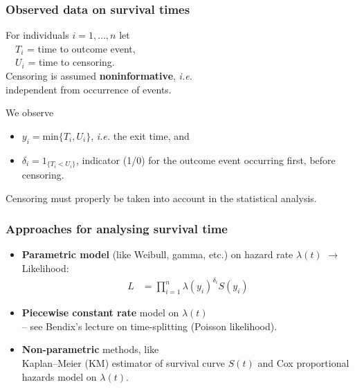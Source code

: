 \documentclass[handout,12pt,dvipsnames,t]{beamer}
\begin{document}
\begin{frame}[fragile]
\frametitle{Observed data on survival times}

For individuals $i = 1, \dots, n$ let \\
$\quad T_i$ = time to outcome event,\\
$\quad U_i$ = time to censoring.\\
\medskip
 Censoring is assumed \textbf{noninformative}, \textit{i.e.} \\ independent 
 from occurrence of events.
 
 \pause\bigskip
We observe 
\begin{itemize}
\item[ ]
$y_i = \text{min}\{ T_i, U_i \}$, \textit{i.e.}
the exit time, and
\item[ ]
 $ \delta_{i} = 1_{ \{ T_i < U_i  \} }$, 
  indicator (1/0) for the outcome event occurring first, before censoring. 
\end{itemize}

Censoring must properly be taken into account in the statistical analysis.


\end{frame}

\begin{frame}[fragile]
\frametitle{Approaches for analysing survival time}

\begin{itemize}
\item 
\textbf{Parametric model} (like Weibull, gamma, etc.) on hazard rate $\lambda(t)$  
 $\to$ Likelihood:
\begin{align*} 
L & = \prod_{i=1}^n \lambda(y_i)^{\delta_i} S(y_i) 
\end{align*}   
\item 
\textbf{Piecewise constant rate} model on $\lambda(t)$ \\ 
-- see Bendix's lecture on time-splitting (Poisson likelihood). 
\medskip
\pause
\item 
\textbf{Non-parametric} methods, 
like \\ Kaplan--Meier (KM) %
estimator of survival curve $S(t)$ and Cox %
proportional hazards model on $\lambda(t)$.

\end{itemize}



\end{frame}
\end{document}
